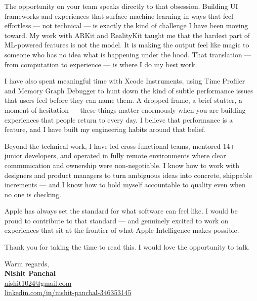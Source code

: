 \documentclass[10pt]{article}
\makeatletter
\def\email{nishit1024@gmail.com}
\def\LinkedIn{nishit-panchal-346353145}
\makeatother
\begin{document}
\noindent
The opportunity on your team speaks directly to that obsession. Building UI frameworks and experiences that surface machine learning in ways that feel effortless --- not technical --- is exactly the kind of challenge I have been moving toward. My work with ARKit and RealityKit taught me that the hardest part of ML-powered features is not the model. It is making the output feel like magic to someone who has no idea what is happening under the hood. That translation --- from computation to experience --- is where I do my best work.

\vspace{0.8em}

\noindent
I have also spent meaningful time with Xcode Instruments, using Time Profiler and Memory Graph Debugger to hunt down the kind of subtle performance issues that users feel before they can name them. A dropped frame, a brief stutter, a moment of hesitation --- these things matter enormously when you are building experiences that people return to every day. I believe that performance is a feature, and I have built my engineering habits around that belief.

\vspace{0.8em}

\noindent
Beyond the technical work, I have led cross-functional teams, mentored 14+ junior developers, and operated in fully remote environments where clear communication and ownership were non-negotiable. I know how to work with designers and product managers to turn ambiguous ideas into concrete, shippable increments --- and I know how to hold myself accountable to quality even when no one is checking.

\vspace{0.8em}

\noindent
Apple has always set the standard for what software can feel like. I would be proud to contribute to that standard --- and genuinely excited to work on experiences that sit at the frontier of what Apple Intelligence makes possible.

\vspace{0.8em}

\noindent
Thank you for taking the time to read this. I would love the opportunity to talk.

\vspace{1.5em}

\noindent
Warm regards, \\
\vspace{0.3em}
{\bfseries Nishit Panchal} \\
\href{mailto:\email}{\email} \\
\href{https://www.linkedin.com/in/\LinkedIn}{linkedin.com/in/\LinkedIn}
\end{document}
